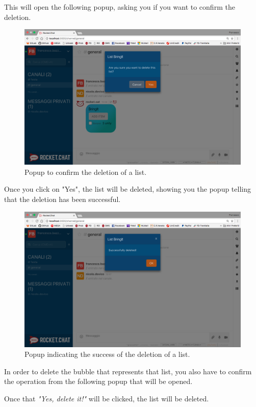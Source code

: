This will open the following popup, asking you if you want to confirm the deletion.

\begin{figure}[H]
  \centering 
  \includegraphics[width=\textwidth]{Sections/3-HowToUse/Images/popup_delete_confirm.png}
  \caption{Popup to confirm the deletion of a list.}
\end{figure}

Once you click on "Yes", the list will be deleted, showing you the popup telling that the deletion has been successful.

\begin{figure}[H]
  \centering 
  \includegraphics[width=\textwidth]{Sections/3-HowToUse/Images/popup_delete_success.png}
  \caption{Popup indicating the success of the deletion of a list.}
\end{figure}

In order to delete the bubble that represents that list, you also have to confirm the operation from the following popup that will be opened.


Once that \textit{"Yes, delete it!"} will be clicked, the list will be deleted.